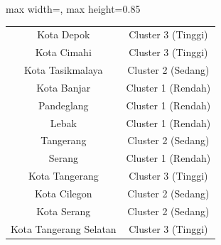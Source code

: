 \begin{table}[H]
\begin{adjustbox}{max width=\textwidth, max height=0.85\textheight}
\begin{tabular}{|c|c|}
Kota Depok & Cluster 3 (Tinggi) \\
Kota Cimahi & Cluster 3 (Tinggi) \\
Kota Tasikmalaya & Cluster 2 (Sedang) \\
Kota Banjar & Cluster 1 (Rendah) \\
Pandeglang & Cluster 1 (Rendah) \\
Lebak & Cluster 1 (Rendah) \\
Tangerang & Cluster 2 (Sedang) \\
Serang & Cluster 1 (Rendah) \\
Kota Tangerang & Cluster 3 (Tinggi) \\
Kota Cilegon & Cluster 2 (Sedang) \\
Kota Serang & Cluster 2 (Sedang) \\
Kota Tangerang Selatan & Cluster 3 (Tinggi) \\
\hline
\end{tabular}
\end{adjustbox}
\end{table}
